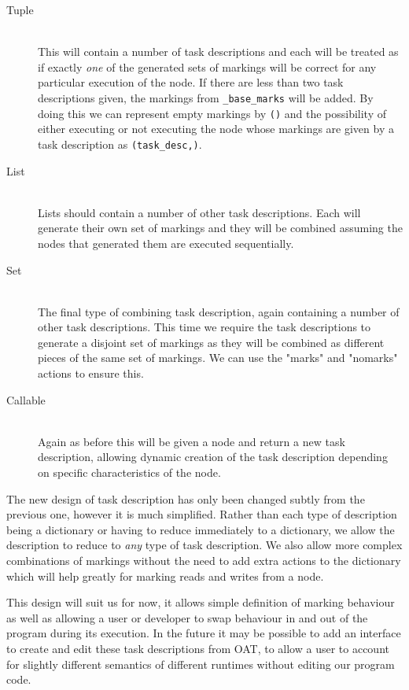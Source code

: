 \documentclass[twoside,a4paper]{report}
\begin{document}
\begin{description}
\item[Tuple] \hfill \\
This will contain a number of task descriptions and each will be treated as if exactly \textit{one} of the generated sets of markings will be correct
for any particular execution of the node. If there are less than two task descriptions given, the markings from \texttt{\_base\_marks} will be added.
By doing this we can represent empty markings by \texttt{()} and the possibility of either executing or not executing the node whose markings are
given by a task description as \texttt{(task\_desc,)}.

\item[List] \hfill \\
Lists should contain a number of other task descriptions. Each will generate their own set of markings and they will be combined assuming the nodes
that generated them are executed sequentially.

\item[Set] \hfill \\
The final type of combining task description, again containing a number of other task descriptions. This time we require the task descriptions to
generate a disjoint set of markings as they will be combined as different pieces of the same set of markings. We can use the "marks" and "nomarks"
actions to ensure this.

\item[Callable] \hfill \\
Again as before this will be given a node and return a new task description, allowing dynamic creation of the task description depending on
specific characteristics of the node.

\end{description}

The new design of task description has only been changed subtly from the previous one, however it is much simplified. Rather than each type of
description being a dictionary or having to reduce immediately to a dictionary, we allow the description to reduce to \textit{any} type of 
task description. We also allow more complex combinations of markings without the need to add extra actions to the dictionary which will
help greatly for marking reads and writes from a node.

This design will suit us for now, it allows simple definition of marking behaviour as well as allowing a user or developer to swap behaviour in
and out of the program during its execution. In the future it may be possible to add an interface to create and edit these task descriptions from
OAT, to allow a user to account for slightly different semantics of different runtimes without editing our program code.
\end{document}
